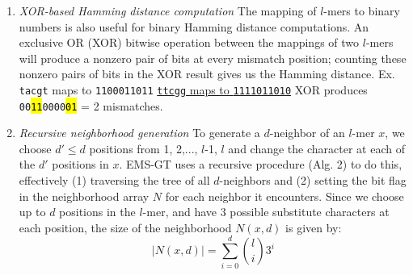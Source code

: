 \documentclass{acm_proc_article-sp}
\begin{document}
\begin{enumerate}
		\item{\em XOR-based Hamming distance computation}\newline
			The mapping of $l$-mers to binary numbers  is also useful for binary Hamming distance computations. An exclusive OR (XOR) bitwise operation between the mappings of two $l$-mers will produce a nonzero pair of bits at every mismatch position; counting these nonzero pairs of bits in the XOR result gives us the Hamming distance.\newline \newline
			{\small Ex.	\texttt{tacgt} maps to \texttt{1100011011} \newline
				\vspace*{2pt}\hspace*{12pt} \underline{\texttt{ttcgg} maps to \texttt{1111011010}} \newline
				\hspace*{17pt}	XOR produces \texttt{00\hl{11}0000\hl{01}} = 2 mismatches.}
		\item{\em Recursive neighborhood generation}\newline
			To generate a $d$-neighbor of an $l$-mer $x$, we choose $d' \leq d$ positions from 1, 2,..., $l$-1, $l$ and change the character at each of the $d'$ positions in $x$. EMS-GT uses a recursive procedure (Alg. 2) to do this, effectively (1) traversing the tree of all $d$-neighbors and (2) setting the bit flag in the neighborhood array $N$ for each neighbor it encounters. Since we choose up to $d$ positions in the $l$-mer, and have 3 possible substitute characters at each position, the size of the neighborhood $N(x,d)$ is given by: %
			\begin{equation}
				|N(x,d)| = \sum_{i=0}^d \binom{l}{i} 3^{i}
			\end{equation}


\end{enumerate}
\end{document}
